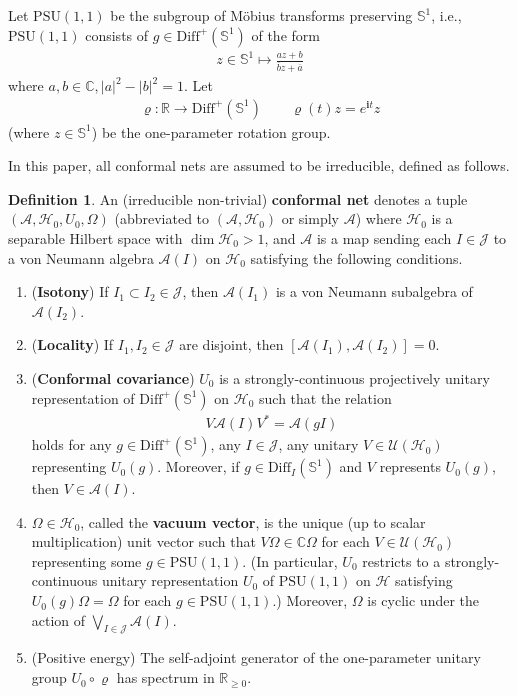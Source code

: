 \documentclass[11pt,b5paper,notitlepage]{article}
\theoremstyle{definition}
\newtheorem{df}{Definition}[section]
\theoremstyle{plain}
\newcommand{\ovl}{\overline}
\newcommand{\Diff}{\mathrm{Diff}}
\newcommand{\DiffS}{\mathrm{Diff}^+(\mathbb S^1)}
\newcommand{\PSU}{\mathrm{PSU}(1,1)}
\newcommand{\im}{\mathbf{i}}
\newcommand{\Cbb}{\mathbb C}
\newcommand{\Rbb}{\mathbb R}
\newcommand{\Sbb}{{\mathbb S}}
\newcommand{\MA}{\mathcal A}
\newcommand{\MH}{\mathcal H}
\newcommand{\MJ}{\mathcal J}
\newcommand{\MU}{\mathcal U}
\numberwithin{equation}{section}
\begin{document}
Let $\PSU$ be the subgroup of M\"obius transforms preserving $\Sbb^1$, i.e., $\PSU$ consists of $g\in\DiffS$ of the form
\begin{align*}
z\in\Sbb^1\mapsto\frac{az+b}{\ovl bz+\ovl a}
\end{align*}
where $a,b\in\Cbb,|a|^2-|b|^2=1$. Let
\begin{align}\label{eq3}
\varrho:\Rbb\rightarrow\DiffS\qquad \varrho(t)z=e^{\im t}z
\end{align}
(where $z\in\Sbb^1$) be the one-parameter rotation group.


In this paper, all conformal nets are assumed to be irreducible, defined as follows.

\begin{df}\label{lb2}
An (irreducible non-trivial) \textbf{conformal net} denotes a tuple $(\MA,\MH_0,U_0,\Omega)$ (abbreviated to $(\MA,\MH_0)$ or simply $\MA$) where $\MH_0$ is a separable Hilbert space with $\dim\MH_0>1$, and $\MA$ is a map sending each $I\in\MJ$ to a von Neumann algebra $\MA(I)$ on $\MH_0$ satisfying the following conditions.
\begin{enumerate}[label=(\alph*)]
\item (\textbf{Isotony}) If $I_1\subset I_2\in\MJ$, then $\MA(I_1)$ is a von Neumann subalgebra of $\MA(I_2)$.
\item (\textbf{Locality}) If $I_1,I_2\in\MJ$ are disjoint, then $[\MA(I_1),\MA(I_2)]=0$.
\item (\textbf{Conformal covariance}) $U_0$ is a strongly-continuous projectively unitary representation of $\DiffS$ on $\MH_0$ such that the relation
\begin{align*}
V\MA(I)V^*=\MA(gI)
\end{align*}
holds for any $g\in\DiffS$, any $I\in\MJ$, any unitary $V\in\MU(\MH_0)$ representing $U_0(g)$. Moreover, if $g\in\Diff_I(\Sbb^1)$ and $V$ represents $U_0(g)$, then $V\in\MA(I)$.
\item $\Omega\in\MH_0$, called the \textbf{vacuum vector}, is the unique (up to scalar multiplication) unit vector such that $V\Omega\in\Cbb\Omega$ for each $V\in\MU(\MH_0)$ representing some $g\in\PSU$. (In particular, $U_0$ restricts to a strongly-continuous unitary representation $U_0$ of $\PSU$ on $\MH$ satisfying $U_0(g)\Omega=\Omega$ for each $g\in\PSU$.) Moreover, $\Omega$ is cyclic under the action of $\bigvee_{I\in\MJ}\MA(I)$. 
\item (Positive energy) The self-adjoint generator of the one-parameter unitary group $U_0\circ\varrho$ has spectrum in $\Rbb_{\geq0}$.
\end{enumerate}
\end{df}
\end{document}
